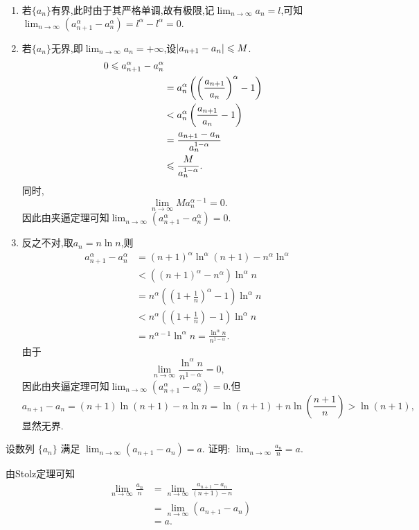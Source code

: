 \begin{solution}
    \begin{enumerate}
        \item 若$\{a_n\}$有界,此时由于其严格单调,故有极限,记$\lim_{n\to\infty}a_n=l$,可知$\lim_{n \to \infty} (a_{n+1}^\alpha - a_n^\alpha) = l^\alpha-l^\alpha=0.$
        \item 若$\{a_n\}$无界,即$\lim_{n\to\infty}a_n=+\infty$,设$\left|a_{n+1}-a_n\right| \leqslant M$.
        \begin{align*}
            0\leqslant a_{n+1}^\alpha - a_n^\alpha\\
            &=a_n^\alpha\left(\left(\frac{a_{n+1}}{a_n}\right)^\alpha - 1\right)\\
            &<a_n^\alpha\left(\frac{a_{n+1}}{a_n} - 1\right)\\
            &=\frac{a_{n+1}-a_n}{a_n^{1-\alpha}}\\
            &\leqslant\frac{M}{a_n^{1-\alpha}}.
        \end{align*}
        同时,$$\lim_{n\to\infty}Ma_n^{\alpha-1}=0.$$
        因此由夹逼定理可知$\lim_{n \to \infty} (a_{n+1}^\alpha - a_n^\alpha) = 0$.
        \item 反之不对,取$a_n=n\ln n$,则\begin{align*}
            a_{n+1}^\alpha-a_n^\alpha&=(n+1)^\alpha\ln^\alpha(n+1)-n^\alpha\ln^\alpha\\
            &<\left((n+1)^\alpha-n^\alpha\right)\ln^\alpha n\\
            &=n^\alpha\left(\left(1+\frac{1}{n}\right)^\alpha-1\right)\ln^\alpha n\\
            &<n^\alpha\left(\left(1+\frac{1}{n}\right)-1\right)\ln^\alpha n\\
            &=n^{\alpha-1}\ln^\alpha n=\frac{\ln^\alpha n}{n^{1-\alpha}}.
        \end{align*}
        由于$$\lim_{n\to\infty}\frac{\ln^\alpha n}{n^{1-\alpha}}=0,$$因此由夹逼定理可知$\lim_{n \to \infty} (a_{n+1}^\alpha - a_n^\alpha) = 0$.但$$a_{n+1}-a_n=(n+1)\ln(n+1)-n\ln n=\ln (n+1)+n\ln\left(\frac{n+1}{n}\right)>\ln(n+1),$$显然无界.
    \end{enumerate}
\end{solution}

\begin{exercise}[1.C.7]
    设数列 $\{a_n\}$ 满足 $\lim_{n \to \infty} (a_{n+1}-a_n) = a$. 证明: $\lim_{n \to \infty} \frac{a_n}{n} = a$.
\end{exercise}

\begin{solution}
    由Stolz定理可知
    \begin{align*}
        \lim_{n \to \infty} \frac{a_n}{n} &= \lim_{n \to \infty} \frac{a_{n+1}-a_n}{(n+1)-n} \\
        &= \lim_{n \to \infty} (a_{n+1}-a_n) \\
        &= a. 
    \end{align*} 
\end{solution}

